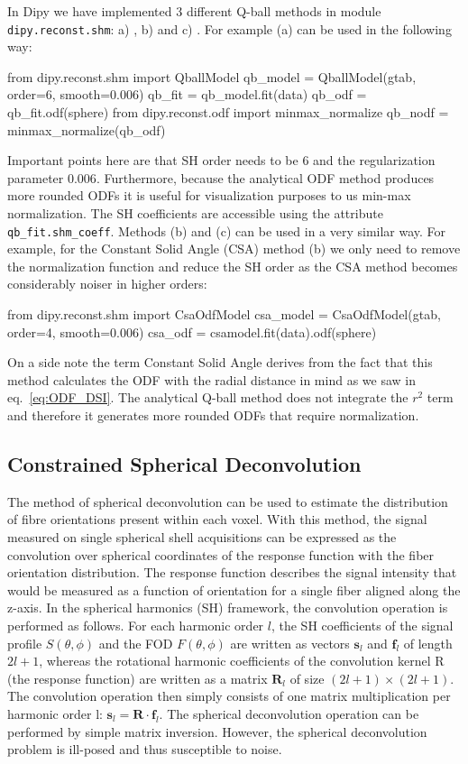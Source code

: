 \documentclass{bioinfo}
\begin{document}
In Dipy we have implemented 3 different Q-ball methods in module \texttt{dipy.reconst.shm}: a) \citep{descoteaux-angelino-etal:07}, b) \citep{aganj-lenglet-etal:10} and c) \citep{tristan-vega-westin-etal:09}. For example (a) can be used in the following way:
\begin{python}
from dipy.reconst.shm import QballModel
qb_model = QballModel(gtab, order=6, smooth=0.006)
qb_fit = qb_model.fit(data)
qb_odf = qb_fit.odf(sphere)
from dipy.reconst.odf import minmax_normalize
qb_nodf = minmax_normalize(qb_odf)
\end{python}
Important points here are that SH order needs to be $6$ and the regularization parameter $0.006$. Furthermore, because the analytical ODF method produces more rounded ODFs it is useful for visualization purposes to us min-max normalization. The SH coefficients are accessible using the attribute \texttt{qb\_fit.shm\_coeff}. Methods (b) and (c) can be used in a very similar way. For example, for the Constant Solid Angle (CSA) \citep{aganj-lenglet-etal:10} method (b) we only need to remove the normalization function and reduce the SH order as the CSA method becomes considerably noiser in higher orders:
\begin{python}
from dipy.reconst.shm import CsaOdfModel
csa_model = CsaOdfModel(gtab, order=4,
                        smooth=0.006)
csa_odf = csamodel.fit(data).odf(sphere)
\end{python}
On a side note the term Constant Solid Angle derives from the fact that this method calculates the ODF with the radial distance in mind as we saw in eq.~\ref{eq:ODF_DSI}. The analytical Q-ball method does not integrate the $r^2$ term and therefore it generates more rounded ODFs that require normalization.

\subsection{Constrained Spherical Deconvolution}

The method of spherical deconvolution \citep{tournier-calamante-etal:04} can be used to estimate the distribution of fibre orientations present within each voxel. With this method, the signal measured on single spherical shell acquisitions can be expressed as the convolution over spherical coordinates of the response function with the fiber orientation distribution. The response function describes the signal intensity that would be measured as a function of orientation for a single fiber aligned along the z-axis. In the spherical harmonics (SH) framework, the convolution operation is performed as follows. For each harmonic order $l$, the SH coefficients of the signal profile $S(\theta, \phi)$ and the FOD $F(\theta, \phi)$ are written as vectors $\mathbf{s}_l$ and $\mathbf{f}_l$ of length $2l+1$, whereas the rotational harmonic coefficients of the convolution kernel R (the response function) are written as a matrix $\mathbf{R}_l$ of size $(2l+ 1)\times(2l+ 1)$. The convolution operation then simply consists of one matrix multiplication per harmonic order l: $\mathbf{s}_l=\mathbf{R}\cdot\mathbf{f}_l$. The spherical deconvolution operation can be performed by simple matrix inversion. However, the spherical deconvolution problem is ill-posed and thus susceptible to noise.
\end{document}
